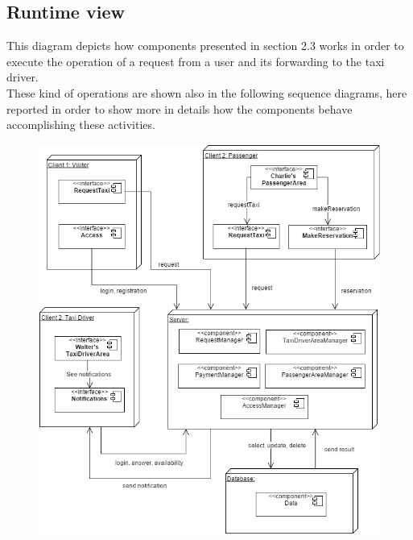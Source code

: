 		\subsection{Runtime view}
		This diagram depicts how components presented in section 2.3 works in order to execute the operation of a request from a user and its forwarding to the taxi driver.\\
		These kind of operations are shown also in the following sequence diagrams, here reported in order to show more in details how the components behave accomplishing these activities.
		\vspace{2cm}
			\begin{figure}[h]
				\centering
				\includegraphics[scale=0.55]{Diagrams/RunTimeView.png}
			\end{figure}

